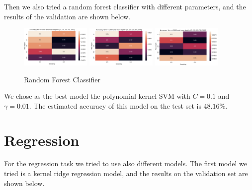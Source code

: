 \documentclass[12pt]{article}
\begin{document}
Then we also tried a random forest classifier with different parameters, and the results of the validation
are shown below.

\begin{figure}[h]
    \centering
    \includegraphics[width=0.3\textwidth]{rf_500_class}
    \includegraphics[width=0.3\textwidth]{rf_1000_class}
    \includegraphics[width=0.3\textwidth]{rf_2000_class}
    \caption{Random Forest Classifier}
    \label{fig:random_forest}
\end{figure}

We chose as the best model the polynomial kernel SVM with $C=0.1$ and $\gamma=0.01$.
The estimated accuracy of this model on the test set is $48.16\%$.

\section{Regression}
For the regression task we tried to use also different models.
The first model we tried is a kernel ridge regression model, and the results
on the validation set are shown below.
\end{document}
